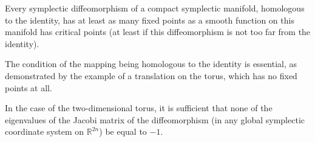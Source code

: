 Every symplectic diffeomorphism of a compact symplectic manifold, homologous to the identity, has at least as many fixed points as a smooth function on this manifold has critical points (at least if this diffeomorphism is not too far from the identity).

The condition of the mapping being homologous to the identity is essential, as demonstrated by the example of a translation on the torus, which has no fixed points at all.

In the case of the two-dimensional torus, it is sufficient that none of the eigenvalues of the Jacobi matrix of the diffeomorphism (in any global symplectic coordinate system on $\mathbb{R}^{2n}$) be equal to $-1$.
